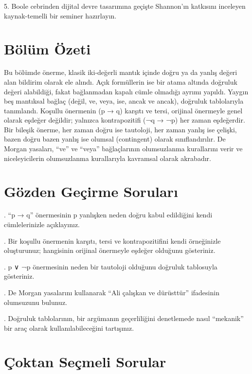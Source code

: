 5. Boole cebrinden dijital devre tasarımına geçişte Shannon’ın katkısını inceleyen kaynak-temelli bir seminer hazırlayın.

\section*{Bölüm Özeti}

Bu bölümde önerme, klasik iki-değerli mantık içinde doğru ya da yanlış değeri alan bildirim olarak ele alındı. Açık formüllerin ise bir atama altında doğruluk değeri alabildiği, fakat bağlanmadan kapalı cümle olmadığı ayrımı yapıldı. Yaygın beş mantıksal bağlaç (değil, ve, veya, ise, ancak ve ancak), doğruluk tablolarıyla tanımlandı. Koşullu önermenin (p → q) karşıtı ve tersi, orijinal önermeyle genel olarak eşdeğer değildir; yalnızca kontrapozitifi (¬q → ¬p) her zaman eşdeğerdir. Bir bileşik önerme, her zaman doğru ise tautoloji, her zaman yanlış ise çelişki, bazen doğru bazen yanlış ise olumsal (contingent) olarak sınıflandırılır. De Morgan yasaları, “ve” ve “veya” bağlaçlarının olumsuzlanma kurallarını verir ve niceleyicilerin olumsuzlanma kurallarıyla kavramsal olarak akrabadır.

\section*{Gözden Geçirme Soruları}

\par{}. “p → q” önermesinin p yanlışken neden doğru kabul edildiğini kendi cümlelerinizle açıklayınız.

\par{}. Bir koşullu önermenin karşıtı, tersi ve kontrapozitifini kendi örneğinizle oluşturunuz; hangisinin orijinal önermeyle eşdeğer olduğunu gösteriniz.

\par{}. p ∨ ¬p önermesinin neden bir tautoloji olduğunu doğruluk tablosuyla gösteriniz.

\par{}. De Morgan yasalarını kullanarak “Ali çalışkan ve dürüsttür” ifadesinin olumsuzunu bulunuz.

\par{}. Doğruluk tablolarının, bir argümanın geçerliliğini denetlemede nasıl “mekanik” bir araç olarak kullanılabileceğini tartışınız.

\section*{Çoktan Seçmeli Sorular}

